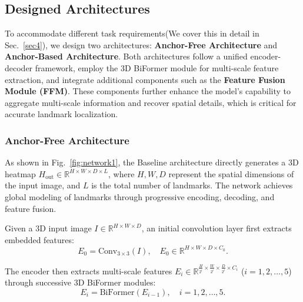 
\subsection{Designed Architectures}
To accommodate different task requirements(We cover this in detail in Sec.~\ref{sec4}), we design two architectures: \textbf{Anchor-Free Architecture} and \textbf{Anchor-Based Architecture}. Both architectures follow a unified encoder-decoder framework, employ the 3D BiFormer module for multi-scale feature extraction, and integrate additional components such as the \textbf{Feature Fusion Module (FFM)}. These components further enhance the model's capability to aggregate multi-scale information and recover spatial details, which is critical for accurate landmark localization.


\subsubsection{Anchor-Free Architecture}
As shown in Fig.~\ref{fig:network1}, the Baseline architecture directly generates a 3D heatmap \( H_{\text{out}} \in \mathbb{R}^{H \times W \times D \times L} \), where \( H, W, D \) represent the spatial dimensions of the input image, and \( L \) is the total number of landmarks. The network achieves global modeling of landmarks through progressive encoding, decoding, and feature fusion.

Given a 3D input image \( I \in \mathbb{R}^{H \times W \times D} \), an initial convolution layer first extracts embedded features:
\begin{equation}
E_0 = \text{Conv}_{3\times3}(I), \quad E_0 \in \mathbb{R}^{H \times W \times D \times C_0}.
\end{equation}

The encoder then extracts multi-scale features \( E_i \in \mathbb{R}^{\frac{H}{2^i} \times \frac{W}{2^i} \times \frac{D}{2^i} \times C_i} \) (\( i = 1, 2, \ldots, 5 \)) through successive 3D BiFormer modules:
\begin{equation}
E_i = \text{BiFormer}(E_{i-1}), \quad i = 1, 2, \ldots, 5.
\end{equation}




